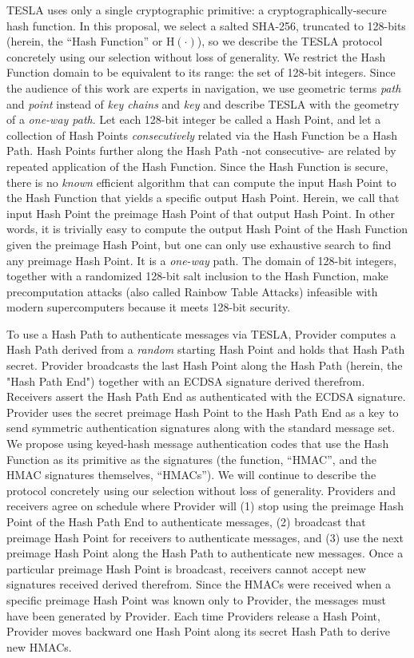 \documentclass[letterpaper,times]{IONconf/IONconf}
\begin{document}
TESLA uses only a single cryptographic primitive: a cryptographically-secure hash function.
In this proposal, we select a salted SHA-256, truncated to 128-bits (herein, the ``Hash Function'' or $\textrm{H}(\cdot)$), so we describe the TESLA protocol concretely using our selection without loss of generality.
We restrict the Hash Function domain to be equivalent to its range: the set of 128-bit integers.
Since the audience of this work are experts in navigation, we use geometric terms {\em path} and {\em point} instead of {\em key chains} and {\em key} and describe TESLA with the geometry of a {\em one-way path}.
Let each 128-bit integer be called a Hash Point, and let a collection of Hash Points {\em consecutively} related via the Hash Function be a Hash Path.
Hash Points further along the Hash Path -not consecutive- are related by repeated application of the Hash Function.
Since the Hash Function is secure, there is no {\em known} efficient algorithm that can compute the input Hash Point to the Hash Function that yields a specific output Hash Point.
Herein, we call that input Hash Point the preimage Hash Point of that output Hash Point.
In other words, it is trivially easy to compute the output Hash Point of the Hash Function given the preimage Hash Point, but one can only use exhaustive search to find any preimage Hash Point.
It is a {\em one-way} path.
The domain of 128-bit integers, together with a randomized 128-bit salt inclusion to the Hash Function, make precomputation attacks (also called Rainbow Table Attacks) infeasible with modern supercomputers because it meets 128-bit security.

To use a Hash Path to authenticate messages via TESLA, Provider computes a Hash Path derived from a {\em random} starting Hash Point and holds that Hash Path secret.
Provider broadcasts the last Hash Point along the Hash Path (herein, the "Hash Path End") together with an ECDSA signature derived therefrom.
Receivers assert the Hash Path End as authenticated with the ECDSA signature.
Provider uses the secret preimage Hash Point to the Hash Path End as a key to send symmetric authentication signatures along with the standard message set.
We propose using keyed-hash message authentication codes that use the Hash Function as its primitive as the signatures (the function, ``HMAC'', and the HMAC signatures themselves, ``HMACs''). 
We will continue to describe the protocol concretely using our selection without loss of generality.
Providers and receivers agree on schedule where Provider will (1) stop using the preimage Hash Point of the Hash Path End to authenticate messages, (2) broadcast that preimage Hash Point for receivers to authenticate messages, and (3) use the next preimage Hash Point along the Hash Path to authenticate new messages.
Once a particular preimage Hash Point is broadcast, receivers cannot accept new signatures received derived therefrom.
Since the HMACs were received when a specific preimage Hash Point was known only to Provider, the messages must have been generated by Provider.
Each time Providers release a Hash Point, Provider moves backward one Hash Point along its secret Hash Path to derive new HMACs.
\end{document}
